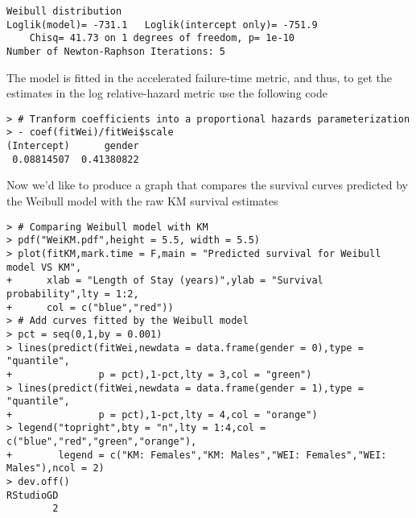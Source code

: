 \begin{enumerate}[(i)]
\begin{spacing}{1.2}
\begin{footnotesize}
\begin{verbatim}
Weibull distribution
Loglik(model)= -731.1   Loglik(intercept only)= -751.9
	Chisq= 41.73 on 1 degrees of freedom, p= 1e-10 
Number of Newton-Raphson Iterations: 5 
\end{verbatim}
\end{footnotesize}
\end{spacing}
The model is fitted in the accelerated failure-time metric, and thus, to get the estimates in the log relative-hazard metric use the following code
\begin{spacing}{1.2}
\begin{footnotesize}
\begin{verbatim}
> # Tranform coefficients into a proportional hazards parameterization
> - coef(fitWei)/fitWei$scale
(Intercept)      gender 
 0.08814507  0.41380822
\end{verbatim}
\end{footnotesize}
\end{spacing}
Now we'd like to produce a graph that compares the survival curves predicted by the Weibull model with the raw KM survival estimates
\begin{spacing}{1.2}
\begin{footnotesize}
\begin{verbatim}
> # Comparing Weibull model with KM
> pdf("WeiKM.pdf",height = 5.5, width = 5.5)
> plot(fitKM,mark.time = F,main = "Predicted survival for Weibull model VS KM",
+      xlab = "Length of Stay (years)",ylab = "Survival probability",lty = 1:2,
+      col = c("blue","red"))
> # Add curves fitted by the Weibull model
> pct = seq(0,1,by = 0.001)
> lines(predict(fitWei,newdata = data.frame(gender = 0),type = "quantile",
+               p = pct),1-pct,lty = 3,col = "green")
> lines(predict(fitWei,newdata = data.frame(gender = 1),type = "quantile",
+               p = pct),1-pct,lty = 4,col = "orange")
> legend("topright",bty = "n",lty = 1:4,col = c("blue","red","green","orange"),
+        legend = c("KM: Females","KM: Males","WEI: Females","WEI: Males"),ncol = 2)
> dev.off()
RStudioGD 
        2 
\end{verbatim}
\end{footnotesize}
\end{spacing}


\end{enumerate}
